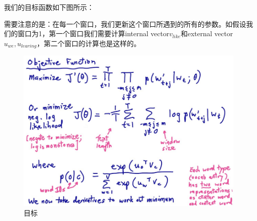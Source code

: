	我们的目标函数如下图所示：
	
	需要注意的是：在每一个窗口，我们更新这个窗口所遇到的所有的参数。如假设我们的窗口为1，第一个窗口我们需要计算internal vector$v_{like}$和external vector$u_{we},u_{learing}$，第二个窗口的计算也是这样的。
	
	\begin{figure}[htbp]
	\centering\includegraphics[width=6.5in]{img/6-5.png}
	\caption{目标}\label{fig:6-5}
	\end{figure}

	\newpage	
	
